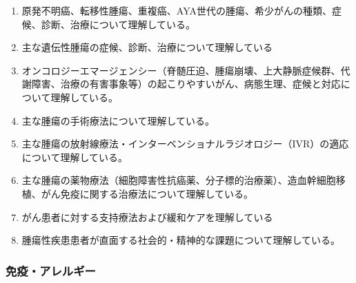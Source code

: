 \begin{enumerate}
\item
  原発不明癌、転移性腫瘍、重複癌、AYA世代の腫瘍、希少がんの種類、症候、診断、治療について理解している。
\item
  主な遺伝性腫瘍の症候、診断、治療について理解している
\item
  オンコロジーエマージェンシー（脊髄圧迫、腫瘍崩壊、上大静脈症候群、代謝障害、治療の有害事象等）の起こりやすいがん、病態生理、症候と対応について理解している。
\item
  主な腫瘍の手術療法について理解している。
\item
  主な腫瘍の放射線療法・インターベンショナルラジオロジー（IVR）の適応について理解している。
\item
  主な腫瘍の薬物療法（細胞障害性抗癌薬、分子標的治療薬）、造血幹細胞移植、がん免疫に関する治療法について理解している。
\item
  がん患者に対する支持療法および緩和ケアを理解している
\item
  腫瘍性疾患患者が直面する社会的・精神的な課題について理解している。
\end{enumerate}

\hypertarget{ux514dux75abux30a2ux30ecux30ebux30aeux30fc}{%
\subsubsection{免疫・アレルギー}\label{ux514dux75abux30a2ux30ecux30ebux30aeux30fc}}

